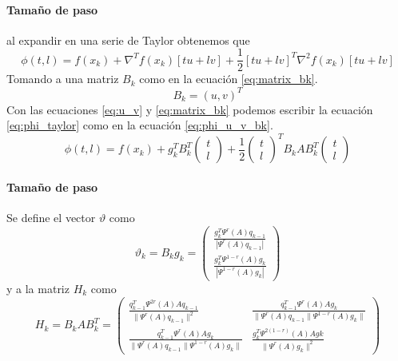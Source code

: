 \begin{frame}{\insertsectionhead}
    \framesubtitle{Tamaño de paso}
    al expandir en una serie de Taylor obtenemos que
    \begin{equation}
        \phi(t,l) = f(x_k)+\nabla^T f(x_k) \left[tu+lv \right] + \frac{1}{2}\left[tu+ lv \right]^T\nabla^2 f(x_k) \left[tu+lv \right] \label{eq:phi_taylor}
    \end{equation}
    Tomando a una matriz $B_k$ como en la ecuación \ref{eq:matrix_bk}.
    \begin{equation}
        B_k =  \left(u, v\right)^T \label{eq:matrix_bk}
    \end{equation}
    Con las ecuaciones \ref{eq:u_v} y \ref{eq:matrix_bk} podemos escribir la ecuación \ref{eq:phi_taylor} como en la ecuación \ref{eq:phi_u_v_bk}.
    \begin{equation}
        \phi(t, l) =  f(x_k)+g_k^TB_k^T\begin{pmatrix}t\\l\end{pmatrix} +\frac{1}{2}\begin{pmatrix}t\\l\end{pmatrix}^TB_k A B_k^T\begin{pmatrix}t\\l\end{pmatrix} \label{eq:phi_u_v_bk}
    \end{equation}
\end{frame}

\begin{frame}{\insertsectionhead}
    \framesubtitle{Tamaño de paso}
    Se define el vector $\vartheta$ como
    \begin{equation}
        \vartheta_k = B_kg_k =
        \begin{pmatrix}
            \frac{g_k^T\Psi^r(A)q_{k-1}}{|\Psi^{r}(A)q_{k-1}|} \\[0.25cm]
            \frac{g_k^T\Psi^{1-r}(A)g_k}{|\Psi^{1-r}(A)g_k|}
        \end{pmatrix}
        \label{eq:vartheta_k}
    \end{equation}
    y a la matriz $H_k$ como
    \begin{equation}
        H_k = B_kAB_k^T =\begin{pmatrix}
            \frac{q_{k-1}^T\Psi^{2r}(A)Aq_{k-1}}{\|\Psi^{r}(A)q_{k-1}\|^2}             & \frac{q_{k-1}^T\Psi^r(A)Ag_{k}}{\|\Psi^{r}(A)q_{k-1}\|\Psi^{1-r}(A)g_k\| } \\
            \frac{q_{k-1}^T\Psi^r(A)Ag_{k}}{\|\Psi^{r}(A)q_{k-1}\|\Psi^{1-r}(A)g_k\| } &
            \frac{g_k^T\Psi^{2(1-r)}(A)Ag{k}}{\|\Psi^{r}(A)g_k\|^2}
        \end{pmatrix} \label{eq:hk_bkabk}
    \end{equation}
\end{frame}

